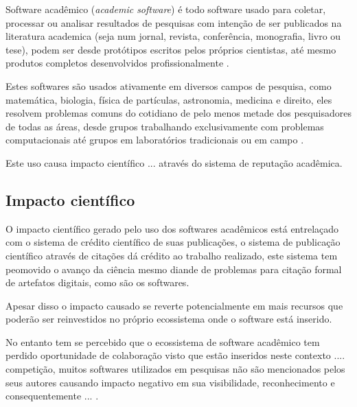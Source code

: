 Software acadêmico ({\it academic software}) é todo software usado para
coletar, processar ou analisar resultados de pesquisas com intenção de ser
publicados na literatura academica (seja num jornal, revista, conferência,
monografia, livro ou tese), podem ser desde protótipos escritos pelos próprios
cientistas, até mesmo produtos completos desenvolvidos profissionalmente
\cite{allen2017engineering}.

Estes softwares são usados ativamente em diversos campos de pesquisa, como
matemática, biologia, física de partículas, astronomia, medicina e direito,
eles resolvem problemas comuns do cotidiano de pelo menos metade dos
pesquisadores de todas as áreas, desde grupos trabalhando exclusivamente com
problemas computacionais até grupos em laboratórios tradicionais ou em campo
\cite{wilson2014best}.

Este uso causa impacto científico ... através do sistema de reputação acadêmica.

\subsection{Impacto científico}


O impacto científico gerado pelo uso dos softwares acadêmicos está
entrelaçado com o sistema de crédito científico de suas publicações,
o sistema de publicação científico através de citações dá crédito ao
trabalho realizado, este sistema tem peomovido o avanço da ciência
mesmo diande de problemas para citação formal de artefatos digitais,
como são os softwares.

Apesar disso o impacto causado se reverte potencialmente em mais
recursos que poderão ser reinvestidos no próprio ecossistema onde
o software está inserido.



No entanto tem se percebido que o ecossistema de software acadêmico tem perdido
oportunidade de colaboração visto que estão inseridos neste contexto ....
competição, muitos softwares utilizados em pesquisas não são mencionados
pelos seus autores causando impacto negativo em sua visibilidade, reconhecimento e
consequentemente ...  \cite{howison2016software}.

